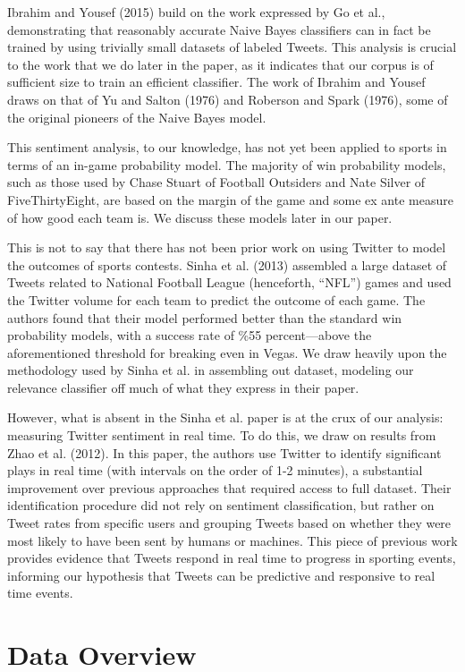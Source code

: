 \documentclass[12pt]{article}
\begin{document}
\begin{doublespacing}
Ibrahim and Yousef (2015) build on the work expressed by Go et al., demonstrating that reasonably accurate Naive Bayes classifiers can in fact be trained by using trivially small datasets of labeled Tweets. This analysis is crucial to the work that we do later in the paper, as it indicates that our corpus is of sufficient size to train an efficient classifier. The work of Ibrahim and Yousef draws on that of Yu and Salton (1976) and Roberson and Spark (1976), some of the original pioneers of the Naive Bayes model.   

This sentiment analysis, to our knowledge, has not yet been applied to sports in terms of an in-game probability model. The majority of win probability models, such as those used by Chase Stuart of Football Outsiders and Nate Silver of FiveThirtyEight, are based on the margin of the game and some ex ante measure of how good each team is. We discuss these models later in our paper. 

This is not to say that there has not been prior work on using Twitter to model the outcomes of sports contests. Sinha et al. (2013) assembled a large dataset of Tweets related to National Football League (henceforth, ``NFL'') games and used the Twitter volume for each team to predict the outcome of each game. The authors found that their model performed better than the standard win probability models, with a success rate of \%55 percent---above the aforementioned threshold for breaking even in Vegas. We draw heavily upon the methodology used by Sinha et al. in assembling out dataset, modeling our relevance classifier off much of what they express in their paper.  

However, what is absent in the Sinha et al. paper is at the crux of our analysis: measuring Twitter sentiment in real time. To do this, we draw on results from Zhao et al. (2012). In this paper, the authors use Twitter to identify significant plays in real time (with intervals on the order of 1-2 minutes), a substantial improvement over previous approaches that required access to full dataset. Their identification procedure did not rely on sentiment classification, but rather on Tweet rates from specific users and grouping Tweets based on whether they were most likely to have been sent by humans or machines. This piece of previous work provides evidence that Tweets respond in real time to progress in sporting events, informing our hypothesis that Tweets can be predictive and responsive to real time events. 

\section{Data Overview}


\end{doublespacing}
\end{document}
